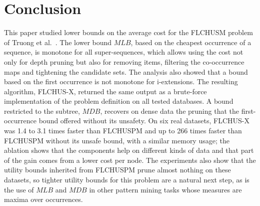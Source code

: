 \documentclass[runningheads]{llncs}
\newcommand{\FL}{\textsc{FLCHUSPM}}
\newcommand{\FX}{\textsc{FLCHUS-X}}
\newcommand{\mlb}{\ensuremath{\mathit{MLB}}}
\newcommand{\mdb}{\ensuremath{\mathit{MDB}}}
\begin{document}
\begin{table}[t]
\centering
\caption{Ablation: median runtime (s) of \FX{} at the default setting and with one component
disabled (ratio to \FX{} in parentheses).}
\label{tab:ablation}
\resizebox{\textwidth}{!}{}
\end{table}

\section{Conclusion}\label{sec:concl}

This paper studied lower bounds on the average cost for the FLCHUSM problem of Truong et al.\
\cite{truong2022}. The lower bound \mlb{}, based on the cheapest occurrence of a sequence, is
monotone for all super-sequences, which allows using the cost not only for depth pruning but
also for removing items, filtering the co-occurrence maps and tightening the candidate sets. The
analysis also showed that a bound based on the first occurrence is not monotone for
i-extensions. The resulting algorithm, \FX{}, returned the same output as a brute-force
implementation of the problem definition on all tested databases.
A bound restricted to the subtree, \mdb{}, recovers on dense data the pruning that the
first-occurrence bound offered without its unsafety. On six real datasets, \FX{} was 1.4 to 3.1
times faster than \FL{} and up to 266 times faster than \FL{} without its unsafe bound, with a
similar memory usage; the ablation shows that the components help on different kinds of data
and that part of the gain comes from a lower cost per node. The experiments also show that the
utility bounds inherited from \FL{} prune almost nothing on these datasets, so tighter utility
bounds for this problem are a natural next step, as is the use of \mlb{} and \mdb{} in other
pattern mining tasks whose measures are maxima over occurrences.
\end{document}
